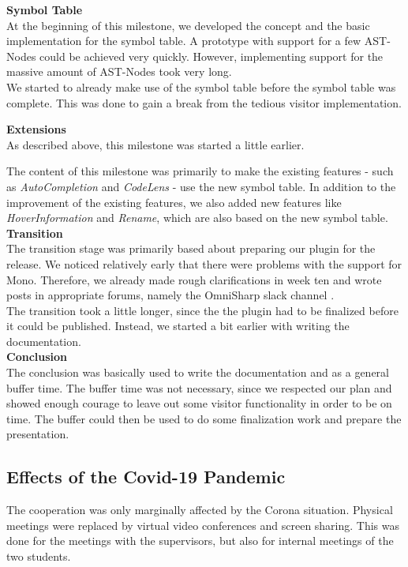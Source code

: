 {\bf Symbol Table}\\
At the beginning of this milestone,
we developed the concept and the basic implementation for the symbol table.
A prototype with support for a few AST-Nodes could be achieved very quickly.
However, implementing support for the massive amount of AST-Nodes took very long.\\

We started to already make use of the symbol table before the symbol table was complete.
This was done to gain a break from the tedious visitor implementation.

{\bf Extensions}\\
As described above, this milestone was started a little earlier.

The content of this milestone was primarily to make the existing features
- such as \textit{AutoCompletion} and \textit{CodeLens} -
use the new symbol table.
In addition to the improvement of the existing features, we also
added new features like \textit{HoverInformation} and \textit{Rename},
which are also based on the new symbol table.\\

{\bf Transition}\\
The transition stage was primarily based about preparing our plugin for the release.
We noticed relatively early that there were problems with the support for Mono.
Therefore, we already made rough clarifications in week ten and wrote posts in appropriate forums,
namely the OmniSharp slack channel \cite{mono-slack}.\\

The transition took a little longer, since the the plugin had to be finalized before it could be published.
Instead, we started a bit earlier with writing the documentation.\\

{\bf Conclusion}\\
The conclusion was basically used to write the documentation and as a general buffer time.
The buffer time was not necessary, since we respected our plan and showed enough courage to leave out some visitor functionality in order to be on time.
The buffer could then be used to do some finalization work and prepare the presentation.\\

\subsection{Effects of the Covid-19 Pandemic}
The cooperation was only marginally affected by the Corona situation.
Physical meetings were replaced by virtual video conferences and screen sharing.
This was done for the meetings with the supervisors, but also for internal meetings of the two students.

